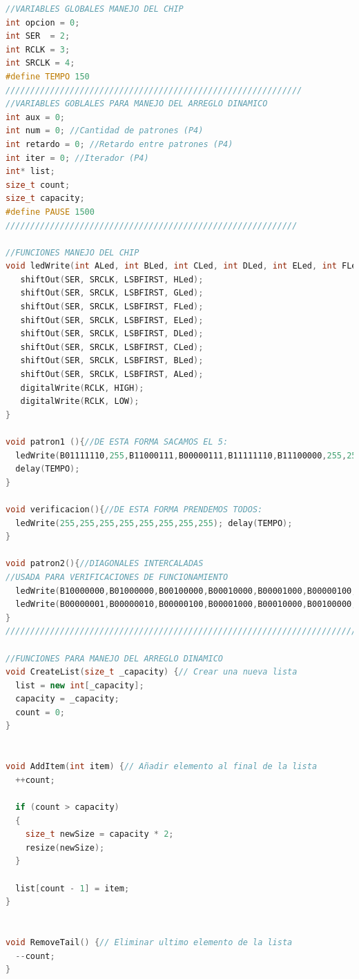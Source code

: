 \documentclass{article}
\begin{document}
\begin{lstlisting}[language=C++, label=codigo_ejemplo]
//VARIABLES GLOBALES MANEJO DEL CHIP
int opcion = 0;
int SER  = 2;
int RCLK = 3;
int SRCLK = 4;
#define TEMPO 150
////////////////////////////////////////////////////////////
//VARIABLES GOBLALES PARA MANEJO DEL ARREGLO DINAMICO
int aux = 0;
int num = 0; //Cantidad de patrones (P4)
int retardo = 0; //Retardo entre patrones (P4)
int iter = 0; //Iterador (P4)
int* list;
size_t count;
size_t capacity;
#define PAUSE 1500
///////////////////////////////////////////////////////////

//FUNCIONES MANEJO DEL CHIP
void ledWrite(int ALed, int BLed, int CLed, int DLed, int ELed, int FLed, int GLed, int HLed){//Funcion para escribir en la matriz
   shiftOut(SER, SRCLK, LSBFIRST, HLed);
   shiftOut(SER, SRCLK, LSBFIRST, GLed);
   shiftOut(SER, SRCLK, LSBFIRST, FLed);
   shiftOut(SER, SRCLK, LSBFIRST, ELed);
   shiftOut(SER, SRCLK, LSBFIRST, DLed);
   shiftOut(SER, SRCLK, LSBFIRST, CLed);
   shiftOut(SER, SRCLK, LSBFIRST, BLed);
   shiftOut(SER, SRCLK, LSBFIRST, ALed);
   digitalWrite(RCLK, HIGH);
   digitalWrite(RCLK, LOW);
}

void patron1 (){//DE ESTA FORMA SACAMOS EL 5:
  ledWrite(B01111110,255,B11000111,B00000111,B11111110,B11100000,255,255);
  delay(TEMPO); 
}

void verificacion(){//DE ESTA FORMA PRENDEMOS TODOS:
  ledWrite(255,255,255,255,255,255,255,255); delay(TEMPO);  
}

void patron2(){//DIAGONALES INTERCALADAS
//USADA PARA VERIFICACIONES DE FUNCIONAMIENTO
  ledWrite(B10000000,B01000000,B00100000,B00010000,B00001000,B00000100,B00000010,B00000001); delay(TEMPO);
  ledWrite(B00000001,B00000010,B00000100,B00001000,B00010000,B00100000,B01000000,B10000000); delay(TEMPO);
}
///////////////////////////////////////////////////////////////////////////////////////

//FUNCIONES PARA MANEJO DEL ARREGLO DINAMICO
void CreateList(size_t _capacity) {// Crear una nueva lista
  list = new int[_capacity];
  capacity = _capacity;
  count = 0;
}


void AddItem(int item) {// Añadir elemento al final de la lista
  ++count;
    
  if (count > capacity)
  {
    size_t newSize = capacity * 2;
    resize(newSize);
  } 

  list[count - 1] = item;
}


void RemoveTail() {// Eliminar ultimo elemento de la lista
  --count;
}


\end{lstlisting}
\end{document}
